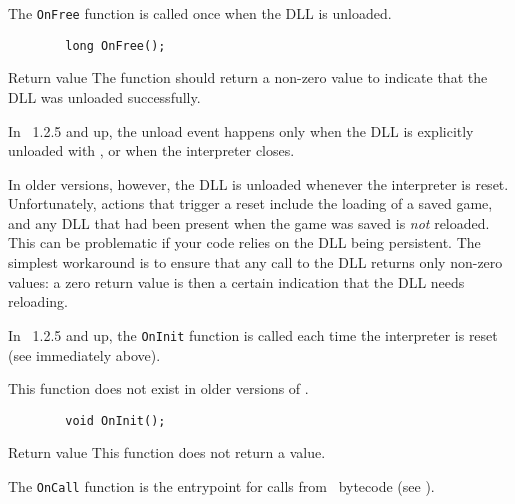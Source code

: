       The \lstinline|OnFree| function is called once when the DLL is unloaded.
      
      \begin{lstlisting}
        long OnFree();
      \end{lstlisting}
      \noindent
      \begin{nicelist}
      \item[Return value]
        The function should return a non-zero value to indicate that the DLL
        was unloaded successfully.
      \end{nicelist}

      In \reallive\ 1.2.5 and up, the unload event happens only when the DLL is 
      explicitly unloaded with , or when the interpreter closes.
      
      In older versions, however, the DLL is unloaded whenever the interpreter 
      is reset.  Unfortunately, actions that trigger a reset include the loading
      of a saved game, and any DLL that had been present when the game was saved
      is \emph{not} reloaded.  This can be problematic if your code relies on 
      the DLL being persistent.  The simplest workaround is to ensure that any
      call to the DLL returns only non-zero values: a zero return value is then
      a certain indication that the DLL needs reloading.
   
      In \reallive\ 1.2.5 and up, the \lstinline|OnInit| function is called 
      each time the interpreter is reset (see immediately above).

      This function does not exist in older versions of \reallive.
      
      \begin{lstlisting}
        void OnInit();
      \end{lstlisting}
      \noindent
      \begin{nicelist}
      \item[Return value]
        This function does not return a value.
      \end{nicelist}
  
      The \lstinline|OnCall| function is the entrypoint for calls from
      \reallive\ bytecode (see ).
      
